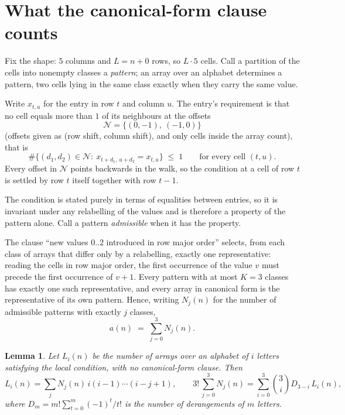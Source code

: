 \documentclass[11pt,a4paper]{article}
\theoremstyle{plain}
\newtheorem{lemma}[theorem]{Lemma}
\theoremstyle{definition}
\begin{document}
\section{What the canonical-form clause counts}

Fix the shape: $5$ columns and $L=n+0$ rows, so $L\cdot5$ cells. Call a
partition of the cells into nonempty classes a \emph{pattern}; an array over an alphabet
determines a pattern, two cells lying in the same class exactly when they carry the same
value.

Write $x_{t,u}$ for the entry in row $t$ and column $u$. The
entry's requirement is that no cell equals more than $1$ of its neighbours at the
offsets
\[
\mathcal N=\{(0,-1),\ (-1,0)\}
\]
(offsets given as (row shift, column shift), and only cells inside the array count),
that is
\begin{equation}\label{eq:loc}
\#\bigl\{(d_1,d_2)\in\mathcal N:\ x_{t+d_1,\,u+d_2}=x_{t,u}\bigr\}\;\le\;1
\qquad\text{for every cell }(t,u).
\end{equation}
Every offset in $\mathcal N$ points backwards in the walk, so the condition at a cell of
row $t$ is settled by row $t$ itself together with row $t-1$.

The condition is stated purely in terms of equalities between entries, so it is invariant
under any relabelling of the values and is therefore a property of the pattern alone. Call a
pattern \emph{admissible} when it has the property.

The clause ``new values $0..2$ introduced in row major order'' selects, from each class
of arrays that differ only by a relabelling, exactly one representative: reading the cells in
row major order, the first occurrence of the value $v$ must precede the first occurrence of
$v+1$. Every pattern with at most $K=3$ classes has exactly one such representative, and
every array in canonical form is the representative of its own pattern. Hence, writing
$N_j(n)$ for the number of admissible patterns with exactly $j$ classes,
\begin{equation}\label{eq:apat}
a(n)\;=\;\sum_{j=0}^{3}N_j(n).
\end{equation}

\begin{lemma}\label{lem:inv}
Let $L_i(n)$ be the number of arrays over an alphabet of $i$ letters satisfying the local
condition, with no canonical-form clause. Then
\[
L_i(n)=\sum_j N_j(n)\,i(i-1)\cdots(i-j+1),
\qquad
3!\,\sum_{j=0}^{3}N_j(n)=\sum_{i=0}^{3}\binom{3}{i}D_{3-i}\,L_i(n),
\]
where $D_m=m!\sum_{t=0}^{m}(-1)^t/t!$ is the number of derangements of $m$ letters.
\end{lemma}
\end{document}

